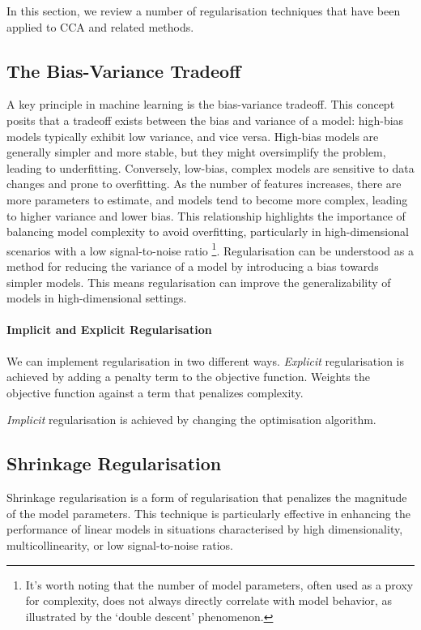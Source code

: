 In this section, we review a number of regularisation techniques that have been applied to CCA and related methods.

\subsection{The Bias-Variance Tradeoff}

A key principle in machine learning is the bias-variance tradeoff.
This concept posits that a tradeoff exists between the bias and variance of a model: high-bias models typically exhibit low variance, and vice versa.
High-bias models are generally simpler and more stable, but they might oversimplify the problem, leading to underfitting.
Conversely, low-bias, complex models are sensitive to data changes and prone to overfitting.
As the number of features increases, there are more parameters to estimate, and models tend to become more complex, leading to higher variance and lower bias.
This relationship highlights the importance of balancing model complexity to avoid overfitting, particularly in high-dimensional scenarios with a low signal-to-noise ratio \citep{mcintosh2021comparison}\footnote{It's worth noting that the number of model parameters, often used as a proxy for complexity, does not always directly correlate with model behavior, as illustrated by the `double descent' phenomenon.}.
Regularisation can be understood as a method for reducing the variance of a model by introducing a bias towards simpler models.
This means regularisation can improve the generalizability of models in high-dimensional settings.

\paragraph{Implicit and Explicit Regularisation}

We can implement regularisation in two different ways.
\textit{Explicit} regularisation is achieved by adding a penalty term to the objective function. Weights the objective function against a term that penalizes complexity.

\textit{Implicit} regularisation is achieved by changing the optimisation algorithm.

\subsection{Shrinkage Regularisation}

Shrinkage regularisation is a form of regularisation that penalizes the magnitude of the model parameters.
This technique is particularly effective in enhancing the performance of linear models in situations characterised by high dimensionality, multicollinearity, or low signal-to-noise ratios.

